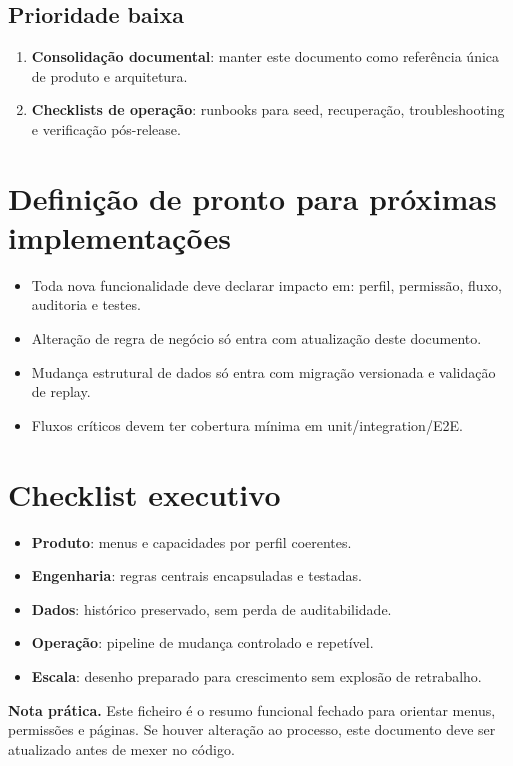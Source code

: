 \documentclass[11pt,a4paper]{article}
\begin{document}
\subsection{Prioridade baixa}
\begin{enumerate}
  \item \textbf{Consolidação documental}: manter este documento como referência única de produto e arquitetura.
  \item \textbf{Checklists de operação}: runbooks para seed, recuperação, troubleshooting e verificação pós-release.
\end{enumerate}

\section{Definição de pronto para próximas implementações}
\begin{itemize}
  \item Toda nova funcionalidade deve declarar impacto em: perfil, permissão, fluxo, auditoria e testes.
  \item Alteração de regra de negócio só entra com atualização deste documento.
  \item Mudança estrutural de dados só entra com migração versionada e validação de replay.
  \item Fluxos críticos devem ter cobertura mínima em unit/integration/E2E.
\end{itemize}

\section{Checklist executivo}
\begin{itemize}
  \item \textbf{Produto}: menus e capacidades por perfil coerentes.
  \item \textbf{Engenharia}: regras centrais encapsuladas e testadas.
  \item \textbf{Dados}: histórico preservado, sem perda de auditabilidade.
  \item \textbf{Operação}: pipeline de mudança controlado e repetível.
  \item \textbf{Escala}: desenho preparado para crescimento sem explosão de retrabalho.
\end{itemize}

\vspace{0.5em}
\noindent\colorbox{softblue}{\parbox{\dimexpr\linewidth-2\fboxsep\relax}{
\textbf{Nota prática.} Este ficheiro é o resumo funcional fechado para orientar menus, permissões e páginas. Se houver alteração ao processo, este documento deve ser atualizado antes de mexer no código.
}}
\end{document}
